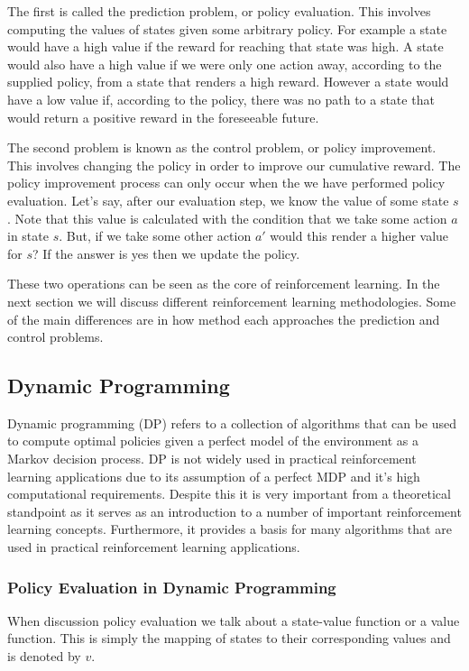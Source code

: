 The first is called the prediction problem, or policy evaluation.
This involves computing the values of states given some arbitrary policy\citep{sutton1998reinforcement}.
For example a state would have a high value if the reward for reaching that state was high.
A state would also have a high value if we were only one action away, according to the supplied policy,
from a state that renders a high reward.
However a state would have a low value if, according to the policy, there was no path to a state that
would return a positive reward in the foreseeable future.

The second problem is known as the control problem, or policy improvement.
This involves changing the policy in order to improve our cumulative reward.
The policy improvement process can only occur when the we have performed policy evaluation.
Let's say, after our evaluation step, we know the value of some state $s$.
Note that this value is calculated with the condition that we take some action $a$ in state $s$.
But, if we take some other action $a'$ would this render a higher value for $s$?
If the answer is yes then we update the policy.

These two operations can be seen as the core of reinforcement learning.
In the next section we will discuss different reinforcement learning methodologies.
Some of the main differences are in how method each approaches the prediction and control problems.

\subsection{Dynamic Programming}\label{subsec:dp}
Dynamic programming (DP) refers to a collection of algorithms that can be used to compute optimal policies given a
perfect model of the environment as a Markov decision process\citep{sutton1998reinforcement}.
DP is not widely used in practical reinforcement learning applications due to its assumption
of a perfect MDP and it's high computational requirements.
Despite this it is very important from a theoretical standpoint as it serves as an introduction to a number
of important reinforcement learning concepts.
Furthermore, it provides a basis for many algorithms that are used in practical reinforcement learning applications.

\subsubsection{Policy Evaluation in Dynamic Programming}
When discussion policy evaluation we talk about a state-value function or a value function.
This is simply the mapping of states to their corresponding values and is denoted by $v$.

